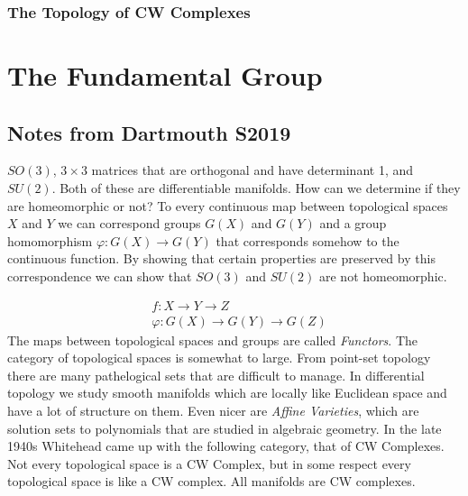 \documentclass{book}                                                           %
\begin{document}
            \subsection{The Topology of CW Complexes}
                
\chapter{The Fundamental Group}
    \section{Notes from Dartmouth S2019}
    \begin{example}
        $SO(3)$, $3\times{3}$ matrices that are orthogonal and have determinant
        1, and $SU(2)$. Both of these are differentiable manifolds. How can we
        determine if they are homeomorphic or not? To every continuous map
        between topological spaces $X$ and $Y$ we can correspond groups $G(X)$
        and $G(Y)$ and a group homomorphism $\varphi:G(X)\rightarrow{G}(Y)$ that
        corresponds somehow to the continuous function. By showing that certain
        properties are preserved by this correspondence we can show that $SO(3)$
        and $SU(2)$ are not homeomorphic.
    \end{example}
    \begin{align}
        &f:X\rightarrow{Y}\rightarrow{Z}\\
        &\varphi:G(X)\rightarrow{G}(Y)\rightarrow{G}(Z)
    \end{align}
    The maps between topological spaces and groups are called \textit{Functors}.
    The category of topological spaces is somewhat to large. From point-set
    topology there are many pathelogical sets that are difficult to manage. In
    differential topology we study smooth manifolds which are locally like
    Euclidean space and have a lot of structure on them. Even nicer are
    \textit{Affine Varieties}, which are solution sets to polynomials that are
    studied in algebraic geometry. In the late 1940s Whitehead came up with the
    following category, that of CW Complexes. Not every topological space is a
    CW Complex, but in some respect every topological space is like a CW
    complex. All manifolds are CW complexes.
\end{document}

